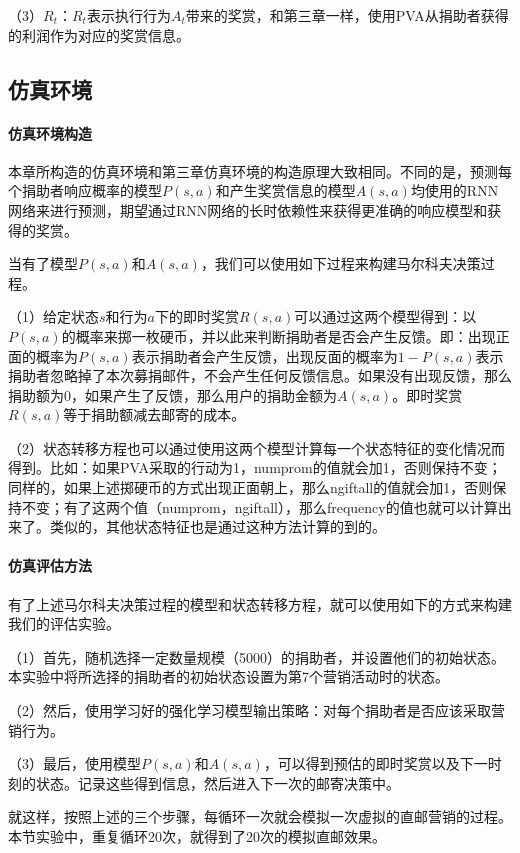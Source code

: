 （3）$R_{t}$：$R_{t}$表示执行行为$A_{t}$带来的奖赏，和第三章一样，使用PVA从捐助者获得的利润作为对应的奖赏信息。

\subsection{仿真环境}
\paragraph{仿真环境构造}
本章所构造的仿真环境和第三章仿真环境的构造原理大致相同。不同的是，预测每个捐助者响应概率的模型$P(s,a)$和产生奖赏信息的模型$A(s,a)$均使用的RNN网络来进行预测，期望通过RNN网络的长时依赖性来获得更准确的响应模型和获得的奖赏。

当有了模型$P(s,a)$和$A(s,a)$，我们可以使用如下过程来构建马尔科夫决策过程。

（1）给定状态$s$和行为$a$下的即时奖赏$R(s,a)$可以通过这两个模型得到：以$P(s,a)$的概率来掷一枚硬币，并以此来判断捐助者是否会产生反馈。即：出现正面的概率为$P(s,a)$表示捐助者会产生反馈，出现反面的概率为$1-P(s,a)$表示捐助者忽略掉了本次募捐邮件，不会产生任何反馈信息。如果没有出现反馈，那么捐助额为$0$，如果产生了反馈，那么用户的捐助金额为$A(s,a)$。即时奖赏$R(s,a)$等于捐助额减去邮寄的成本。

（2）状态转移方程也可以通过使用这两个模型计算每一个状态特征的变化情况而得到。比如：如果PVA采取的行动为1，numprom的值就会加1，否则保持不变；同样的，如果上述掷硬币的方式出现正面朝上，那么ngiftall的值就会加1，否则保持不变；有了这两个值（numprom，ngiftall），那么frequency的值也就可以计算出来了。类似的，其他状态特征也是通过这种方法计算的到的。

\paragraph{仿真评估方法}
有了上述马尔科夫决策过程的模型和状态转移方程，就可以使用如下的方式来构建我们的评估实验。

（1）首先，随机选择一定数量规模（5000）的捐助者，并设置他们的初始状态。本实验中将所选择的捐助者的初始状态设置为第7个营销活动时的状态。

（2）然后，使用学习好的强化学习模型输出策略：对每个捐助者是否应该采取营销行为。

（3）最后，使用模型$P(s,a)$和$A(s,a)$，可以得到预估的即时奖赏以及下一时刻的状态。记录这些得到信息，然后进入下一次的邮寄决策中。

就这样，按照上述的三个步骤，每循环一次就会模拟一次虚拟的直邮营销的过程。本节实验中，重复循环20次，就得到了20次的模拟直邮效果。

